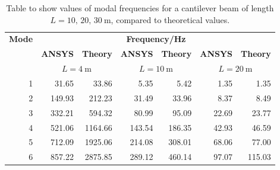 \begin{table}[H]
    \centering
    \begin{tabular}{@{}rrrrrrr@{}}
        \toprule
        \textbf{Mode} & \multicolumn{6}{c}{\textbf{Frequency/Hz}}                                                                                                                                              \\
                      & \textbf{ANSYS}                            & \textbf{Theory}                           & \textbf{ANSYS}                            & \textbf{Theory} & \textbf{ANSYS} & \textbf{Theory} \\
                      & \multicolumn{2}{c}{$L = \SI{4}{\meter}$}  & \multicolumn{2}{c}{$L = \SI{10}{\meter}$} & \multicolumn{2}{c}{$L = \SI{20}{\meter}$}                                                      \\
        \midrule
        1             & 31.65                                     & 33.86                                     & 5.35                                      & 5.42            & 1.35           & 1.35            \\
        2             & 149.93                                    & 212.23                                    & 31.49                                     & 33.96           & 8.37           & 8.49            \\
        3             & 332.21                                    & 594.32                                    & 80.99                                     & 95.09           & 22.69          & 23.77           \\
        4             & 521.06                                    & 1164.66                                   & 143.54                                    & 186.35          & 42.93          & 46.59           \\
        5             & 712.09                                    & 1925.06                                   & 214.08                                    & 308.01          & 68.06          & 77.00           \\
        6             & 857.22                                    & 2875.85                                   & 289.12                                    & 460.14          & 97.07          & 115.03          \\
        \bottomrule
    \end{tabular}
    \caption{Table to show values of modal frequencies for a cantilever beam of length $L = 10,\,20,\,\SI{30}{\meter}$, compared to theoretical values.}
    \label{modal1}
\end{table}
